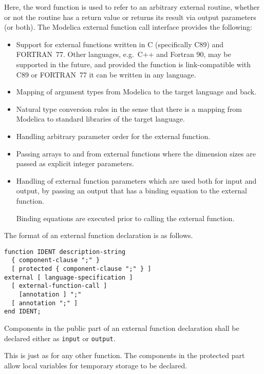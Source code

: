 Here, the word function is used to refer to an arbitrary external
routine, whether or not the routine has a return value or returns its
result via output parameters (or both). The Modelica external function
call interface provides the following:
\begin{itemize}
\item
  Support for external functions written in C (specifically C89) and
  FORTRAN~77. Other languages, e.g.\ C++ and Fortran 90, may be supported
  in the future, and provided the function is link-compatible with C89
  or FORTRAN~77 it can be written in any language.
\item
  Mapping of argument types from Modelica to the target language and
  back.
\item
  Natural type conversion rules in the sense that there is a mapping
  from Modelica to standard libraries of the target language.
\item
  Handling arbitrary parameter order for the external function.
\item
  Passing arrays to and from external functions where the dimension
  sizes are passed as explicit integer parameters.
\item
  Handling of external function parameters which are used both for input
  and output, by passing an output that has a binding equation to
  the external function.
  \begin{nonnormative}
  Binding equations are executed prior to calling the external function.
  \end{nonnormative}
\end{itemize}

The format of an external function declaration is as follows.
\begin{lstlisting}[language=grammar]
function IDENT description-string
  { component-clause ";" }
  [ protected { component-clause ";" } ]
external [ language-specification ]
  [ external-function-call ]
    [annotation ] ";"
  [ annotation ";" ]
end IDENT;
\end{lstlisting}

Components in the public part of an external function declaration shall be declared either as \lstinline!input! or \lstinline!output!.

\begin{nonnormative}
This is just as for any other function.  The components in the protected part allow local variables for temporary storage to be declared.
\end{nonnormative}

